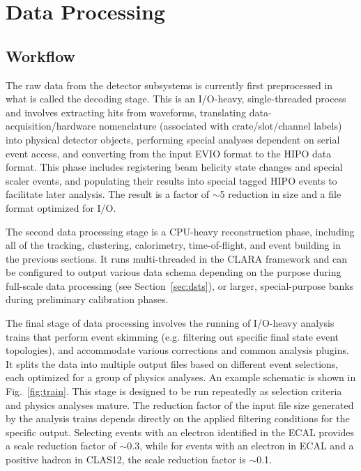 \section{Data Processing}
\label{sec:dataproc}

\subsection{Workflow}

The raw data from the detector subsystems is currently first preprocessed in what is called the decoding
stage. This is an I/O-heavy, single-threaded process and involves extracting hits from waveforms, translating
data-acquisition/hardware nomenclature (associated with crate/slot/channel labels) into physical detector objects,
performing special analyses dependent on serial event access, and converting from the input EVIO format to the
HIPO data format.  This phase includes registering beam helicity state changes and special scaler events, and
populating their results into special tagged HIPO events to facilitate later analysis.  The result is a factor of
$\sim$5 reduction in size and a file format optimized for I/O.

The second data processing stage is a CPU-heavy reconstruction phase, including all of the tracking, clustering,
calorimetry, time-of-flight, and event building in the previous sections.  It runs multi-threaded in the CLARA
framework and can be configured to output various data schema depending on the purpose during full-scale data
processing (see Section~\ref{sec:dsts}), or larger, special-purpose banks during preliminary calibration phases.

The final stage of data processing involves the running of I/O-heavy analysis trains that perform event skimming
(e.g. filtering out specific final state event topologies),  and accommodate various corrections and common analysis
plugins.  It splits the data into multiple output files based on different event selections, each optimized for a
group of physics analyses. An example schematic is shown in Fig.~\ref{fig:train}. This stage is designed to be run
repeatedly as selection criteria and physics analyses mature. The reduction factor of the input file size generated
by the analysis trains depends directly on the applied filtering conditions for the specific output. Selecting events
with an electron identified in the ECAL provides a scale reduction factor of $\sim$0.3, while for events with an
electron in ECAL and a positive hadron in CLAS12, the scale reduction factor is $\sim$0.1.

